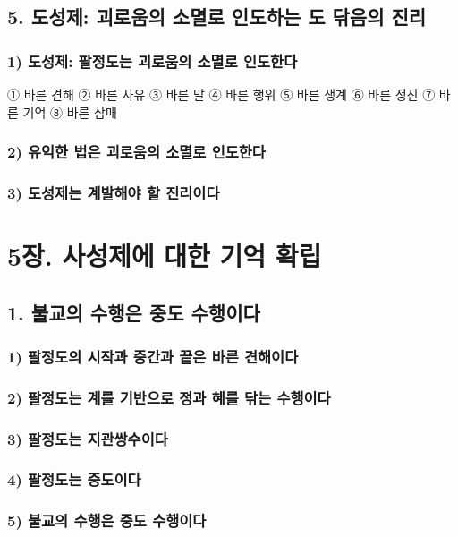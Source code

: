 \documentclass[12pt, a4paper, oneside]{book}
\begin{document}
	\chapter{5. 도성제: 괴로움의 소멸로 인도하는 도 닦음의 진리}
	\section{1) 도성제: 팔정도는 괴로움의 소멸로 인도한다}
① 바른 견해
② 바른 사유
③ 바른 말
④ 바른 행위
⑤ 바른 생계
⑥ 바른 정진
⑦ 바른 기억
⑧ 바른 삼매
	\section{2) 유익한 법은 괴로움의 소멸로 인도한다}
	\section{3) 도성제는 계발해야 할 진리이다}



	\part{5장. 사성제에 대한 기억 확립}

	\newpage
	\chapter{1. 불교의 수행은 중도 수행이다}
	\section{1) 팔정도의 시작과 중간과 끝은 바른 견해이다}
	\section{2) 팔정도는 계를 기반으로 정과 혜를 닦는 수행이다}
	\section{3) 팔정도는 지관쌍수이다}
	\section{4) 팔정도는 중도이다}
	\section{5) 불교의 수행은 중도 수행이다}
\end{document}
